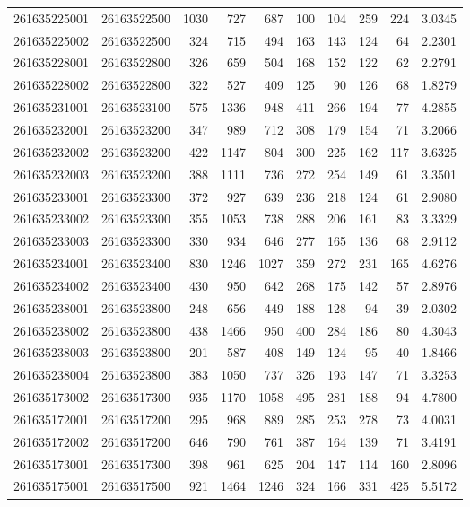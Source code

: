 \documentclass[
  11pt,
]{article}
\begin{document}
\begin{longtable}[t]{llrrrrrrrr}
261635225001 & 26163522500 & 1030 & 727 & 687 & 100 & 104 & 259 & 224 & 3.0345\\
261635225002 & 26163522500 & 324 & 715 & 494 & 163 & 143 & 124 & 64 & 2.2301\\
261635228001 & 26163522800 & 326 & 659 & 504 & 168 & 152 & 122 & 62 & 2.2791\\
261635228002 & 26163522800 & 322 & 527 & 409 & 125 & 90 & 126 & 68 & 1.8279\\
261635231001 & 26163523100 & 575 & 1336 & 948 & 411 & 266 & 194 & 77 & 4.2855\\
261635232001 & 26163523200 & 347 & 989 & 712 & 308 & 179 & 154 & 71 & 3.2066\\
261635232002 & 26163523200 & 422 & 1147 & 804 & 300 & 225 & 162 & 117 & 3.6325\\
261635232003 & 26163523200 & 388 & 1111 & 736 & 272 & 254 & 149 & 61 & 3.3501\\
261635233001 & 26163523300 & 372 & 927 & 639 & 236 & 218 & 124 & 61 & 2.9080\\
261635233002 & 26163523300 & 355 & 1053 & 738 & 288 & 206 & 161 & 83 & 3.3329\\
261635233003 & 26163523300 & 330 & 934 & 646 & 277 & 165 & 136 & 68 & 2.9112\\
261635234001 & 26163523400 & 830 & 1246 & 1027 & 359 & 272 & 231 & 165 & 4.6276\\
261635234002 & 26163523400 & 430 & 950 & 642 & 268 & 175 & 142 & 57 & 2.8976\\
261635238001 & 26163523800 & 248 & 656 & 449 & 188 & 128 & 94 & 39 & 2.0302\\
261635238002 & 26163523800 & 438 & 1466 & 950 & 400 & 284 & 186 & 80 & 4.3043\\
261635238003 & 26163523800 & 201 & 587 & 408 & 149 & 124 & 95 & 40 & 1.8466\\
261635238004 & 26163523800 & 383 & 1050 & 737 & 326 & 193 & 147 & 71 & 3.3253\\
261635173002 & 26163517300 & 935 & 1170 & 1058 & 495 & 281 & 188 & 94 & 4.7800\\
261635172001 & 26163517200 & 295 & 968 & 889 & 285 & 253 & 278 & 73 & 4.0031\\
261635172002 & 26163517200 & 646 & 790 & 761 & 387 & 164 & 139 & 71 & 3.4191\\
261635173001 & 26163517300 & 398 & 961 & 625 & 204 & 147 & 114 & 160 & 2.8096\\
261635175001 & 26163517500 & 921 & 1464 & 1246 & 324 & 166 & 331 & 425 & 5.5172\\

\end{longtable}
\end{document}
